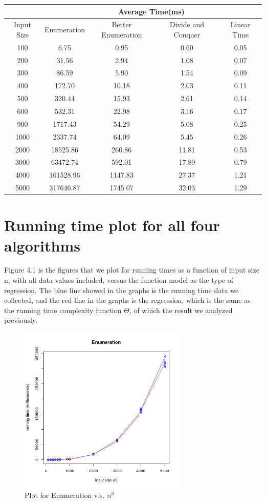 \documentclass[11pt]{scrreprt}
\begin{document}
\begin{tabular}{|c|c|c|c|c|}
	\hline  & \multicolumn{4}{|c|}{Average Time(ms)} \\ 
	\hline Input Size & Enumeration & Better Enumeration & Divide and Conquer & Linear Time \\ 
	\hline  100 & 6.75 & 0.95 & 0.60 & 0.05 \\ 
	\hline  200 & 31.56 & 2.94 & 1.08 & 0.07 \\ 
	\hline  300 & 86.59 & 5.90 & 1.54 & 0.09 \\ 
	\hline  400 & 172.70 & 10.18 & 2.03 & 0.11 \\ 
	\hline  500 & 320.44 & 15.93 & 2.61 & 0.14 \\ 
	\hline  600 & 532.31 & 22.98 & 3.16 & 0.17 \\ 
	\hline  900 & 1717.43 & 54.29 & 5.08 & 0.25 \\ 
	\hline  1000 & 2337.74 & 64.09 & 5.45 & 0.26 \\ 
	\hline  2000 & 18525.86 & 260.86 & 11.81 & 0.53 \\ 
	\hline  3000 & 63472.74 & 592.01 & 17.89 & 0.79 \\ 
	\hline  4000 & 161528.96 & 1147.83 & 27.37 & 1.21 \\ 
	\hline  5000 & 317646.87 & 1745.07 & 32.03 & 1.29 \\
	\hline 
\end{tabular} 


\section {Running time plot for all four algorithms}

Figure 4.1 is the figures that we plot for running times as a function of input size n, with all data values included, versus the function model as the type of regression. The blue line showed in the graphs is the running time data we collected, and the red line in the graphs is the regression, which is the same as the running time complexity function $\Theta$, of which the result we analyzed previously.

\begin{figure}[!htb]
\centering
\includegraphics[width=8cm]{enumeration.png}
\caption{Plot for Enumeration v.s. $n^3$}
\label{figc1}
\end{figure}
\end{document}
